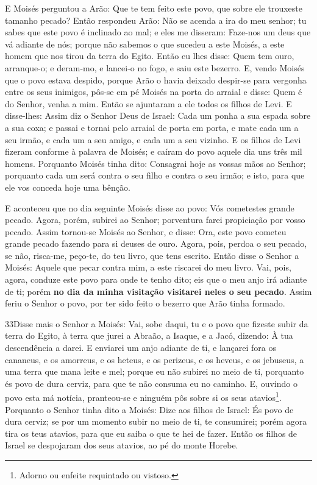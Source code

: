 E Moisés perguntou a Arão: Que te tem feito este povo, que sobre
ele trouxeste tamanho pecado? Então respondeu Arão: Não se
acenda a ira do meu senhor; tu sabes que este povo é inclinado ao
mal; e eles me disseram: Faze-nos um deus que vá adiante de
nós; porque não sabemos o que sucedeu a este Moisés, a este homem
que nos tirou da terra do Egito. Então eu lhes disse: Quem
tem ouro, arranque-o; e deram-mo, e lancei-o no fogo, e saiu este
bezerro. E, vendo Moisés que o povo estava despido, porque
Arão o havia deixado despir-se para vergonha entre os seus inimigos,
pôs-se em pé Moisés na porta do arraial e disse: Quem é do
Senhor, venha a mim. Então se ajuntaram a ele todos os filhos de
Levi. E disse-lhes: Assim diz o Senhor Deus de Israel: Cada
um ponha a sua espada sobre a sua coxa; e passai e tornai pelo
arraial de porta em porta, e mate cada um a seu irmão, e cada um a
seu amigo, e cada um a seu vizinho. E os filhos de Levi
fizeram conforme à palavra de Moisés; e caíram do povo aquele dia
uns três mil homens. Porquanto Moisés tinha dito: Consagrai
hoje as vossas mãos ao Senhor; porquanto cada um será contra o seu
filho e contra o seu irmão; e isto, para que ele vos conceda hoje
uma bênção.

E aconteceu que no dia seguinte Moisés disse ao povo: Vós
cometestes grande pecado. Agora, porém, subirei ao Senhor;
porventura farei propiciação por vosso pecado. Assim
tornou-se Moisés ao Senhor, e disse: Ora, este povo cometeu grande
pecado fazendo para si deuses de ouro. Agora, pois, perdoa o
seu pecado, se não, risca-me, peço-te, do teu livro, que tens
escrito. Então disse o Senhor a Moisés: Aquele que pecar
contra mim, a este riscarei do meu livro. Vai, pois, agora,
conduze este povo para onde te tenho dito; eis que o meu anjo irá
adiante de ti; porém \textbf{no dia da minha visitação visitarei
neles o seu pecado}. Assim feriu o Senhor o povo, por ter
sido feito o bezerro que Arão tinha formado.

\medskip

\lettrine{33} Disse mais o Senhor a Moisés: Vai, sobe daqui,
tu e o povo que fizeste subir da terra do Egito, à terra que jurei a
Abraão, a Isaque, e a Jacó, dizendo: À tua descendência a darei.
E enviarei um anjo adiante de ti, e lançarei fora os cananeus, e
os amorreus, e os heteus, e os perizeus, e os heveus, e os jebuseus,
a uma terra que mana leite e mel; porque eu não subirei no meio
de ti, porquanto és povo de dura cerviz, para que te não consuma eu
no caminho. E, ouvindo o povo esta má notícia, pranteou-se e
ninguém pôs sobre si os seus atavios\footnote{Adorno ou enfeite
requintado ou vistoso.}. Porquanto o Senhor tinha dito a Moisés:
Dize aos filhos de Israel: És povo de dura cerviz; se por um momento
subir no meio de ti, te consumirei; porém agora tira os teus
atavios, para que eu saiba o que te hei de fazer. Então os
filhos de Israel se despojaram dos seus atavios, ao pé do monte
Horebe.

